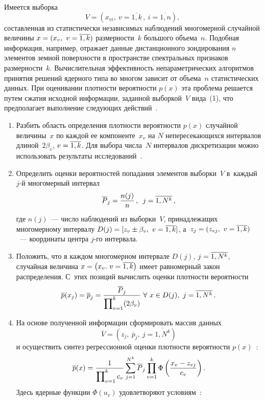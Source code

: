 \begin{multicols}{2}
Имеется выборка
\begin{equation}
V=\left( x_{vi}, \ v=\overline{1,k}\,,\ i=\overline{1,n}\right),
\label{e1-l}
\end{equation}
составленная из статистически независимых наблюдений многомерной 
случайной величины $x\hm= (x_v, \ v\hm= \overline{1,k})$ размерности~$k$ 
большого объема~$n$. Подобная информация, например, отражает данные 
дистанционного зондирования $n$ элементов земной поверхности в пространстве 
спектральных признаков размерности~$k$. Вычислительная эффективность 
непараметрических алгоритмов принятия решений ядерного типа во многом 
зависит от объема~$n$ статистических данных. При оценивании плотности 
вероятности $p(x)$ эта проблема решается путем сжатия исходной 
информации, заданной выборкой~$V$ вида~(1), что предполагает выполнение 
следующих действий~\cite{10-l}.
\begin{enumerate}[1.]
\item  Разбить область определения плотности вероятности $p(x)$ случайной 
величины~$x$ по каждой ее компоненте~$x_v$ на $N$ непересекающихся 
интервалов длиной~$2\beta_v$, $v\hm= \overline{1,k}$. Для выбора числа~$N$ 
интервалов дискретизации можно использовать результаты 
исследований~\cite{10-l, 13-l, 14-l}.
  \item Определить оценки вероятностей попадания элементов выборки~$V$ 
в~каждый $j$-й многомерный интервал
  $$
  \overline{P}_j= \displaystyle\frac{\displaystyle n(j)\mathstrut}{\displaystyle n\mathstrut}\,,\enskip j=\overline{1, N^k}\,,
  $$
где $n(j)$~--- число наблюдений из выборки~$V$, принадлежащих 
многомерному интервалу $D(j)\hm= [z_v\hm\pm \beta_v,\ v\hm=\overline{1,k}]$, 
а~$z_j\hm= (z_{vj}, \ v\hm= \overline{1,k})$~--- координаты центра $j$-го 
интервала.
  \item Положить, что в каждом многомерном интервале $D(j)$, $j\hm= 
\overline{1, N^k}$, случайная величина $x\hm= \left( x_v.\ 
v\hm=\overline{1,k}\right)$ имеет равномерный закон распределения. С~этих 
позиций вычислить оценки плотности вероятности
  $$
  \overline{p}(x_j) =\overline{p}_j= \fr{\overline{P}_j}{\prod\nolimits^k_{v=1} 
(2\beta_v)} \ \forall\ x\in D(j),\ j=\overline{1,N^k}\,.
  $$
  \item На основе полученной информации сформировать массив данных
  \begin{equation}
  \overline{V} =\left( z_j,\ \overline{p}_j,\ j=\overline{1,N^k}\right)
  \label{e2-l}
  \end{equation}
и осуществить синтез регрессионной оценки плотности вероятности 
$p(x)$~\cite{10-l}:
\begin{equation}
\overline{p}(x)=\displaystyle\frac{\displaystyle 1\mathstrut}{\displaystyle \prod\nolimits^k_{v=1} c_v\mathstrut} \sum\limits_{j=1}^{N^k} 
\overline{P}_j \prod\limits^k_{v=1} \Phi \left( \displaystyle\frac{\displaystyle x_v-z_{vj}\mathstrut}{\displaystyle c_v\mathstrut}\right).
\label{e3-l}
\end{equation}
Здесь ядерные функции $\Phi (u_v)$ удовлетворяют условиям~\cite{8-l, 10-l}:


\end{enumerate}
\end{multicols}
